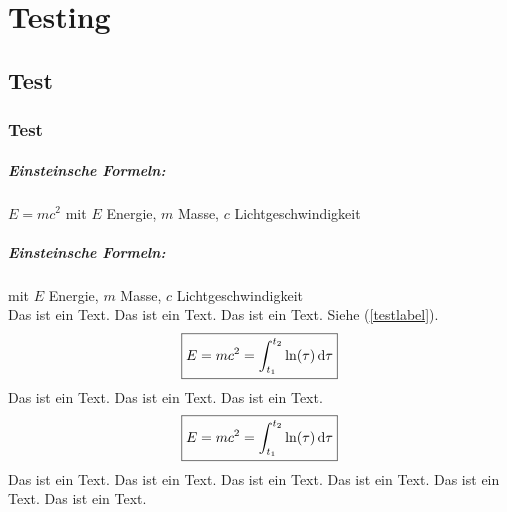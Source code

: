 \hfill

\chapter{Testing}

\section{Test}

\subsection{Test}

\paragraph{Einsteinsche Formeln:} $\boxed{E = mc^2}$ mit $E$ Energie, $m$ Masse, $c$ Lichtgeschwindigkeit


\begin{wrapfigure}{r}{0.4\columnwidth}
\end{wrapfigure}

\paragraph{Einsteinsche Formeln:} mit $E$ Energie, $m$ Masse, $c$ Lichtgeschwindigkeit
\\
Das ist ein Text. Das ist ein Text. Das ist ein Text. Siehe (\ref{testlabel}).
$$\boxed{E = mc^2 = \int_{t_1}^{t_2} \ln (\tau) \, \textnormal{d} \tau}$$
Das ist ein Text. Das ist ein Text. Das ist ein Text.
$$\boxed{E = mc^2 = \int_{t_1}^{t_2} \ln (\tau) \, \textnormal{d} \tau}$$
Das ist ein Text. Das ist ein Text. Das ist ein Text.
Das ist ein Text. Das ist ein Text. Das ist ein Text.

